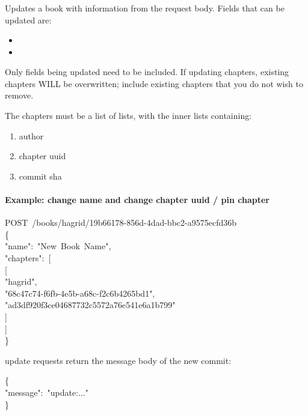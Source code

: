 \documentclass[onecolumn, draftclsnofoot, 10pt, compsoc]{IEEEtran}
\begin{document}
\subsubsection{}\label{sec-post-booksauthoruuid}%

\noindent Updates a book with information from the request body. Fields that can be updated
are:%

\begin{itemize}[noitemsep,topsep=\mdcompacttopsep]%

\item{}%

\item{}%
\end{itemize}%

\noindent Only fields being updated need to be included. If updating chapters,
existing chapters WILL be overwritten; include existing chapters that
you do not wish to remove.%

The chapters must be a list of lists, with the inner lists containing:%

\begin{enumerate}[noitemsep,topsep=\mdcompacttopsep]%

\item author%

\item chapter uuid%

\item commit sha%
\end{enumerate}%

\paragraph{Example: change name and change chapter uuid / pin chapter}\label{sec-example--change-name-and-change-chapter-uuid-pin-chapter}%
\begin{mdpre}%
\noindent POST~/books/hagrid/19b66178-856d-4dad-bbc2-a9575ecfd36b\\
\{\\
"name":~"New~Book~Name",\\
"chapters":~{}[\\
[\\
"hagrid",\\
"68c47c74-f6fb-4e5b-a68c-f2c6b4265bd1",\\
"ad3df920f3ce04687732c5572a76e541e6a1b799"\\
]\\
]\\
\}\\
\end{mdpre}\noindent{} update requests return the message body of the new commit:
\begin{mdpre}%
\noindent\{\\
"message":~"update:..."\\
\}%
\end{mdpre}
\end{document}
